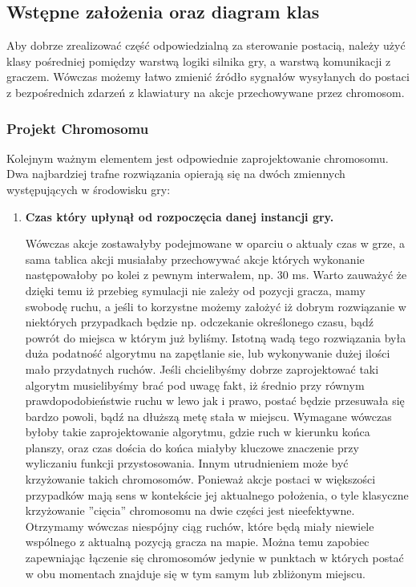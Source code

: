 \subsection{Wstępne założenia oraz diagram klas}
\begin{par}
	Aby dobrze zrealizować część odpowiedzialną za sterowanie postacią, należy użyć klasy pośredniej pomiędzy warstwą logiki silnika gry, a warstwą komunikacji z graczem. 
	Wówczas możemy łatwo zmienić źródło sygnałów wysyłanych do postaci z bezpośrednich zdarzeń z klawiatury na akcje przechowywane przez chromosom. 
	\subsubsection{Projekt Chromosomu}
	Kolejnym ważnym elementem jest odpowiednie zaprojektowanie chromosomu. 
	Dwa najbardziej trafne rozwiązania opierają się na dwóch zmiennych występujących w środowisku gry:
	\begin{enumerate}
	\item
	{\bf Czas który upłynął od rozpoczęcia danej instancji gry. }
	\begin{par}
	Wówczas akcje zostawałyby podejmowane w oparciu o aktualy czas w grze, a sama tablica akcji musiałaby przechowywać akcje których wykonanie następowałoby po kolei z pewnym interwałem, np. 30 ms. 
	Warto zauważyć że dzięki temu iż przebieg symulacji nie zależy od pozycji gracza, mamy swobodę ruchu, a jeśli to korzystne możemy założyć iż dobrym rozwiązanie w niektórych przypadkach będzie np. odczekanie określonego czasu, bądź powrót do miejsca w którym już byliśmy.
	Istotną wadą tego rozwiązania była duża podatność algorytmu na zapętlanie sie, lub wykonywanie dużej ilości mało przydatnych ruchów. 
	Jeśli chcielibyśmy dobrze zaprojektować taki algorytm musielibyśmy brać pod uwagę fakt, iż średnio przy równym prawdopodobieństwie ruchu w lewo jak i prawo, postać będzie przesuwała się bardzo powoli, bądź na dłuższą metę stała w miejscu.
	Wymagane wówczas byłoby takie zaprojektowanie algorytmu, gdzie ruch w kierunku końca planszy, oraz czas dościa do końca miałyby kluczowe znaczenie przy wyliczaniu funkcji przystosowania.
	Innym utrudnieniem może być krzyżowanie takich chromosomów. Ponieważ akcje postaci w większości przypadków mają sens w kontekście jej aktualnego położenia, o tyle klasyczne krzyżowanie ''cięcia'' chromosomu na dwie części jest nieefektywne.
	Otrzymamy wówczas niespójny ciąg ruchów, które będą miały niewiele wspólnego z aktualną pozycją gracza na mapie.
	Można temu zapobiec zapewniając łączenie się chromosomów jedynie w punktach w których postać w obu momentach znajduje się w tym samym lub zbliżonym miejscu.

\end{par}
\end{enumerate}
\end{par}
